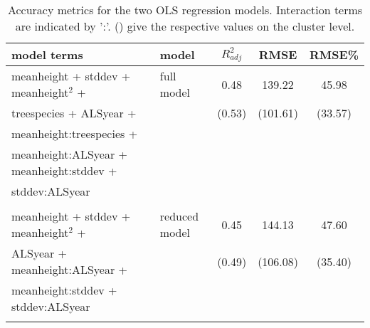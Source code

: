 \begin{table*}[!htbp]
	\begin{center}
	\caption{Accuracy metrics for the two OLS regression models. Interaction terms are indicated by ':'. () give the respective values on the cluster level.} 
	\label{tab:modacc_modterms}
    {\small %
	\begin{tabular}{llccc}
  \hline
model terms & model & $R^2_{adj}$ & RMSE & RMSE\% \\ 
  \hline \hline
meanheight + stddev + meanheight$^2$ +  & full model &  0.48 & 139.22  & 45.98 \\
treespecies + ALSyear + & & (0.53) &  (101.61) & (33.57) \\ 
meanheight:treespecies + \\ meanheight:ALSyear + meanheight:stddev + \\ stddev:ALSyear &&& \\ \\

meanheight + stddev + meanheight$^2$ + & reduced model  & 0.45  & 144.13 & 47.60 \\
ALSyear + meanheight:ALSyear + & & (0.49) & (106.08) & (35.40) \\
meanheight:stddev + stddev:ALSyear &&& \\ \\
\hline
\hline
\end{tabular}
}%
\end{center}
\end{table*}

